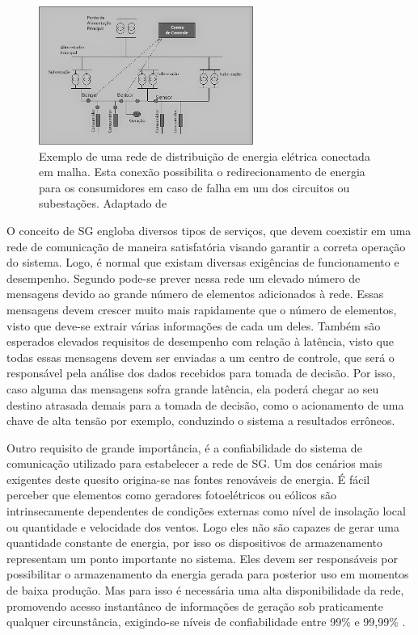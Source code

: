 \documentclass[12pt]{article}
\begin{document}
\begin{figure} %
	\centering
	\includegraphics[width=7cm]{Rede_Distribuicao}
	\caption{Exemplo de uma rede de distribuição de energia elétrica conectada em malha. Esta conexão possibilita o redirecionamento de energia para os consumidores em caso de falha em um dos circuitos ou subestações. Adaptado de \cite{Mag_Bouhafs2012}}
	\label{fig_rede_distribuicao}
\end{figure}

O conceito de SG engloba diversos tipos de serviços, que devem coexistir em uma rede de comunicação de maneira satisfatória visando garantir a correta operação do sistema. Logo, é normal que existam diversas exigências de funcionamento e desempenho. Segundo \cite{Art_Aggarwal2010} pode-se prever nessa rede um elevado número de mensagens devido ao grande número de elementos adicionados à rede. Essas mensagens devem crescer muito mais rapidamente que o número de elementos, visto que deve-se extrair várias informações de cada um deles. Também são esperados elevados requisitos de desempenho com relação à latência, visto que todas essas mensagens devem ser enviadas a um centro de controle, que será o responsável pela análise dos dados recebidos para tomada de decisão. Por isso, caso alguma das mensagens sofra grande latência, ela poderá chegar ao seu destino atrasada demais para a tomada de decisão, como o acionamento de uma chave de alta tensão por exemplo, conduzindo o sistema a resultados errôneos.

Outro requisito de grande importância, é a confiabilidade do sistema de comunicação utilizado para estabelecer a rede de SG. Um dos cenários mais exigentes deste quesito origina-se nas fontes renováveis de energia. É fácil perceber que elementos como geradores fotoelétricos ou eólicos são intrinsecamente dependentes de condições externas como nível de insolação local ou quantidade e velocidade dos ventos. Logo eles não são capazes de gerar uma quantidade constante de energia, por isso os dispositivos de armazenamento representam um ponto importante no sistema. Eles devem ser responsáveis por possibilitar o armazenamento da energia gerada para posterior uso em momentos de baixa produção. Mas para isso é necessária uma alta disponibilidade da rede, promovendo acesso instantâneo de informações de geração sob praticamente qualquer circunstância, exigindo-se níveis de confiabilidade entre 99\% e 99,99\% \cite{Art_Gungor2013}.
\end{document}
